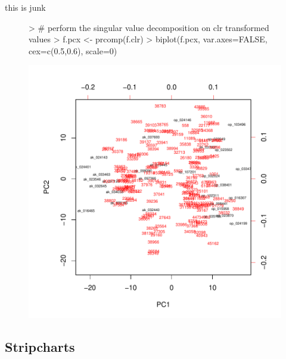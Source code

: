 \documentclass[11pt]{article}
\begin{document}
this is junk

\begin{figure}\label{biplot}
\begin{center}
\begin{Schunk}
\begin{Sinput}
> # perform the singular value decomposition on clr transformed values
> f.pcx <- prcomp(f.clr)
> biplot(f.pcx, var.axes=FALSE, cex=c(0.5,0.6), scale=0)
\end{Sinput}
\end{Schunk}
\includegraphics{CoDaSeq_vignette-003}
\end{center}
\end{figure}
\newpage

\subsection{Stripcharts}
\end{document}
